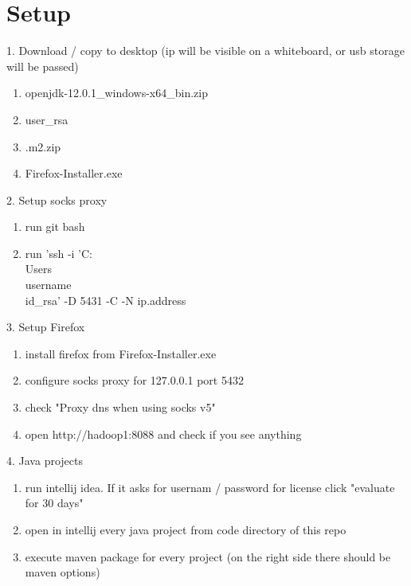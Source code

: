 \documentclass{article}
\begin{document}
\section*{Setup}

1. Download / copy to desktop (ip will be visible on a whiteboard, or usb storage will be passed)
\begin{enumerate}
\item openjdk-12.0.1\_windows-x64\_bin.zip
\item user\_rsa
\item .m2.zip
\item Firefox-Installer.exe
\end{enumerate}

2. Setup socks proxy
\begin{enumerate}
\item run git bash
\item run 'ssh -i 'C:\\Users\\username\\id\_rsa' -D 5431 -C -N ip.address
\end{enumerate}

3. Setup Firefox
\begin{enumerate}
\item install firefox from Firefox-Installer.exe
\item configure socks proxy for 127.0.0.1 port 5432
\item check "Proxy dns when using socks v5"
\item open http://hadoop1:8088 and check if you see anything
\end{enumerate}

4. Java projects
\begin{enumerate}
\item run intellij idea. If it asks for usernam / password for license click "evaluate for 30 days"
\item open in intellij every java project from code directory of this repo
\item execute maven package for every project (on the right side there should be maven options)
\end{enumerate}
\end{document}
